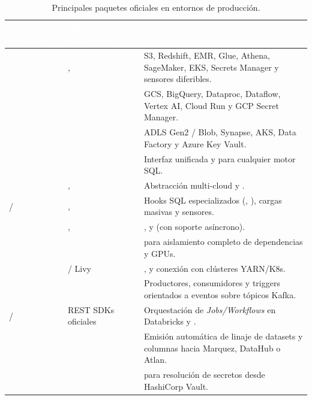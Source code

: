 \begin{table}[htbp]
\centering
\caption{Principales paquetes oficiales  en entornos de producción.}
\label{tab:principales-providers}
\small
\begin{tabularx}{\textwidth}{@{}L{4.5cm} L{3.6cm} Y@{}}
\toprule
{}
\textcolor{white}{\sffamily\bfseries Paquete Provider} &
\textcolor{white}{\sffamily\bfseries SDK / driver subyacente} &
\textcolor{white}{\sffamily\bfseries Capacidades y abstracciones clave} \\
\midrule
{} & ,  & S3, Redshift, EMR, Glue, Athena, SageMaker, EKS, Secrets Manager y sensores diferibles. \\
 &  & GCS, BigQuery, Dataproc, Dataflow, Vertex AI, Cloud Run y GCP Secret Manager. \\
 &  & ADLS Gen2 / Blob, Synapse, AKS, Data Factory y Azure Key Vault. \\
 &  & Interfaz unificada  y  para cualquier motor SQL. \\
 & ,  & Abstracción multi-cloud  y . \\
 /  & ,  & Hooks SQL especializados (, ), cargas masivas y sensores. \\
 & ,  & ,  y  (con soporte asíncrono). \\
 &  &  para aislamiento completo de dependencias y GPUs. \\
 &  / Livy & ,  y conexión con clústeres YARN/K8s. \\
 &  & Productores, consumidores y triggers orientados a eventos sobre tópicos Kafka. \\
 /  & REST SDKs oficiales & Orquestación de \textit{Jobs/Workflows} en Databricks y . \\
 &  & Emisión automática de linaje de datasets y columnas hacia Marquez, DataHub o Atlan. \\
 &  &  para resolución de secretos desde HashiCorp Vault. \\
\bottomrule
\end{tabularx}
\end{table}

